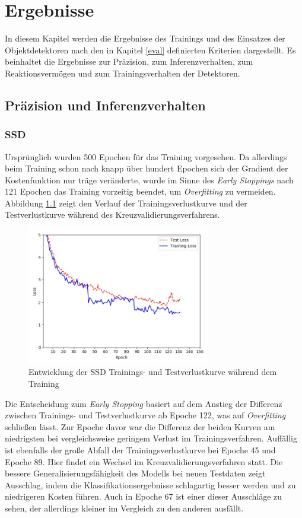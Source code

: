 \chapter{Ergebnisse} \label{evaluation}

In diesem Kapitel werden die Ergebnisse des Trainings und des Einsatzes der Objektdetektoren nach den in Kapitel \ref{eval} definierten Kriterien dargestellt. Es beinhaltet die Ergebnisse zur Präzision, zum Inferenzverhalten, zum Reaktionsvermögen und zum Trainingsverhalten der Detektoren.

\section{Präzision und Inferenzverhalten}

\subsection*{SSD}

Ursprünglich wurden 500 Epochen für das Training vorgesehen. Da allerdings beim Training schon nach knapp über hundert Epochen sich der Gradient der Kostenfunktion nur träge veränderte, wurde im Sinne des \textit{Early Stoppings} nach 121 Epochen das Training vorzeitig beendet, um \textit{Overfitting} zu vermeiden. Abbildung \ref{ssdloss} zeigt den Verlauf der Trainingsverlustkurve und der Testverlustkurve während des Kreuzvalidierungsverfahrens.

\begin{figure}[H]
	\begin{center}
		\includegraphics[width=8cm]{Bilder/ssdloss.jpeg} 
		\caption{Entwicklung der SSD Trainings- und Testverlustkurve während dem Training}
		\label{ssdloss}
	\end{center}
\end{figure}

Die Entscheidung zum \textit{Early Stopping} basiert auf dem Anstieg der Differenz zwischen Trainings- und Testverlustkurve ab Epoche 122, was auf \textit{Overfitting} schließen lässt. Zur Epoche davor war die Differenz der beiden Kurven am niedrigsten bei vergleichsweise geringem Verlust im Trainingsverfahren. Auffällig ist ebenfalls der große Abfall der Trainingsverlustkurve bei Epoche 45 und Epoche 89. Hier findet ein Wechsel im Kreuzvalidierungsverfahren statt. Die bessere Generalisierungsfähigkeit des Modells bei neuen Testdaten zeigt Ausschlag, indem die Klassifikationsergebnisse schlagartig besser werden und zu niedrigeren Kosten führen. Auch in Epoche 67 ist einer dieser Ausschläge zu sehen, der allerdings kleiner im Vergleich zu den anderen ausfällt. 


